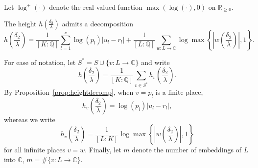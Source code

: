 Let $\log^+(\cdot)$ denote the real valued function $\max(\log(\cdot), 0)$ on $\mathbb{R}_{\geq 0}$. 

\begin{proposition}\label{prop:heightdecomp}
The height $h\left(\frac{\delta_2}{\lambda}\right)$ admits a decomposition 
\begin{equation} \label{eq:hdecomp}
h\left(\frac{\delta_2}{\lambda}\right) = \frac{1}{[K:\mathbb{Q}]}\sum_{l = 1}^{\nu} \log(p_l)|u_l - r_l| + \frac{1}{[L:\mathbb{Q}]}\sum_{w :L \to \mathbb{C}} \log \max \left\{ \left|w\left(\frac{\delta_2}{\lambda}\right)\right|, 1\right\}.
\end{equation}
\end{proposition}
For ease of notation, let $S^* = S \cup \{v : L \to \mathbb{C}\}$ and write 
\[h\left(\frac{\delta_2}{\lambda}\right) = \frac{1}{[K:\mathbb{Q}]}\sum_{v \in S^*}h_{v}\left(\frac{\delta_2}{\lambda}\right).\]
By Proposition~\ref{prop:heightdecomp}, when $v = p_l$ is a finite place, 
\[h_{v}\left(\frac{\delta_2}{\lambda}\right) = \log(p_l)|u_l - r_l|,\]
whereas we write
\[h_{v}\left(\frac{\delta_2}{\lambda}\right) = \frac{1}{[L:K]} \log \max \left\{ \left|w\left(\frac{\delta_2}{\lambda}\right)\right|, 1\right\}\]
for all infinite places $v = w$. Finally, let $m$ denote the number of embeddings of $L$ into $\mathbb{C}$,  $m = \# \{v : L \to \mathbb{C}\}$. 

